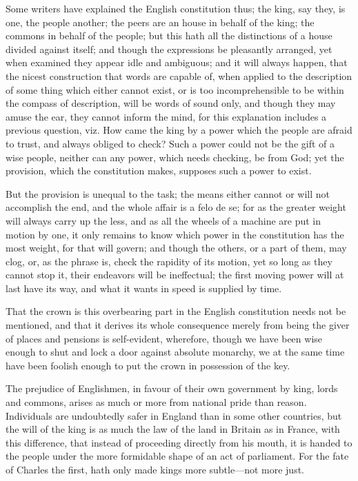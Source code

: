 \documentclass[12pt,oneside]{memoir}
\begin{document}
Some writers have explained the English constitution thus; the king,
say they, is one, the people another; the peers are an house in
behalf of the king; the commons in behalf of the people; but this
hath all the distinctions of a house divided against itself; and
though the expressions be pleasantly arranged, yet when examined
they appear idle and ambiguous; and it will always happen, that the
nicest construction that words are capable of, when applied to the
description of some thing which either cannot exist, or is too
incomprehensible to be within the compass of description, will be
words of sound only, and though they may amuse the ear, they cannot
inform the mind, for this explanation includes a previous question,
viz. How came the king by a power which the people are afraid to
trust, and always obliged to check? Such a power could not be the
gift of a wise people, neither can any power, which needs checking,
be from God; yet the provision, which the constitution makes,
supposes such a power to exist.

But the provision is unequal to the task; the means either cannot or
will not accomplish the end, and the whole affair is a felo de se;
for as the greater weight will always carry up the less, and as all
the wheels of a machine are put in motion by one, it only remains to
know which power in the constitution has the most weight, for that
will govern; and though the others, or a part of them, may clog, or,
as the phrase is, check the rapidity of its motion, yet so long as
they cannot stop it, their endeavors will be ineffectual; the first
moving power will at last have its way, and what it wants in speed
is supplied by time.

That the crown is this overbearing part in the English constitution
needs not be mentioned, and that it derives its whole consequence
merely from being the giver of places and pensions is self-evident,
wherefore, though we have been wise enough to shut and lock a door
against absolute monarchy, we at the same time have been foolish
enough to put the crown in possession of the key.

The prejudice of Englishmen, in favour of their own government by
king, lords and commons, arises as much or more from national pride
than reason. Individuals are undoubtedly safer in England than in
some other countries, but the will of the king is as much the law of
the land in Britain as in France, with this difference, that instead
of proceeding directly from his mouth, it is handed to the people
under the more formidable shape of an act of parliament. For the
fate of Charles the first, hath only made kings more subtle---not
more just.
\end{document}
